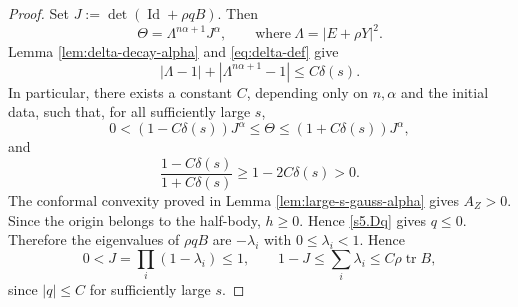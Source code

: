 \documentclass[11pt, reqno]{amsart}
\theoremstyle{remark}
\theoremstyle{definition}
\numberwithin{equation}{section}
\DeclareMathOperator{\tr}{tr}
\newcommand{\Id}{\operatorname{Id}}
\begin{document}
\begin{proof}
Set $J:=\det(\Id+\rho q B)$.
Then
\begin{equation*}
\Theta = \Lambda^{n\alpha+1} J^\alpha,\qquad \mbox{where}\ \Lambda = |E+\rho Y|^2.
\end{equation*}
Lemma \ref{lem:delta-decay-alpha} and \eqref{eq:delta-def} give
\begin{equation*}
        |\Lambda-1|+|\Lambda^{n\alpha+1}-1|\le C\delta(s).
\end{equation*}
In particular, there exists a constant $C$, depending only on $n,\alpha$ and the initial data, such that, for all sufficiently large $s$,
\begin{equation}
    0 < (1 - C \delta(s)) J^\alpha \leq \Theta \leq (1 + C \delta(s)) J^\alpha,
    \label{equ-Theta-bound}
\end{equation}
and
\begin{equation}
    \frac{1 - C\delta(s)}{1 + C\delta(s)} \geq 1 - 2C\delta(s)>0.
    \label{equ-factor-est}
\end{equation} 
The conformal convexity proved in Lemma \ref{lem:large-s-gauss-alpha} gives
$A_Z>0$.  Since the origin belongs to the half-body, $h\ge0$. Hence
\eqref{s5.Dq} gives $q\le0$. Therefore the eigenvalues of $\rho q B$ are
$-\lambda_i$ with $0\le\lambda_i<1$.  Hence
\begin{equation}\label{eq:J-basic}
        0<J=\prod_i(1-\lambda_i)\le1,
        \qquad
        1-J\le\sum_i\lambda_i\le C\rho\tr B,
\end{equation}
since $|q|\leq C$ for sufficiently large $s$.


\end{proof}
\end{document}
